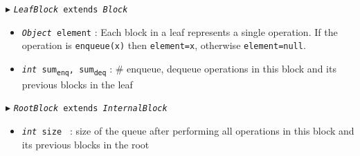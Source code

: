 \documentclass[acmsmall,nonacm,anonymous]{acmart}
\newcommand{\sub}[1]{\textsubscript{#1}}
\renewcommand{\tt}[1]{\texttt{#1}}
\renewcommand{\sl}[1]{\textsl{#1}}
\newcommand{\size}{size }
\begin{document}
\begin{algorithm}
\begin{algorithmic}[1]
\Statex $\blacktriangleright$ \tt{\sl{LeafBlock} extends \sl{Block}}
\begin{itemize}
  \item \tt{\sl{Object} element}
  \textsf{: Each block in a leaf represents a single operation. If the operation is \tt{enqueue(x)} then \tt{element=x}, otherwise \tt{element=null}.}
  
    \item \tt{\sl{int} sum\sub{enq}, sum\sub{deq}}
  \textsf{: \# enqueue, dequeue operations in this block and its previous blocks in the leaf}
\end{itemize}

\Statex $\blacktriangleright$ \tt{\sl{RootBlock} extends \sl{InternalBlock}}
\begin{itemize}
  \item \tt{\sl{int} \size}
  \textsf{: size of the queue after performing all operations in this block and its previous blocks in the root}
\end{itemize}

\end{algorithmic}
\end{algorithm}
\end{document}
